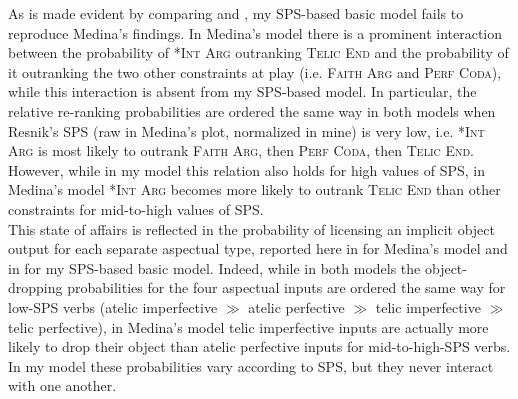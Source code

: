 As is made evident by comparing  and , my SPS-based basic model fails to reproduce Medina's findings. In Medina's model there is a prominent interaction between the probability of \textsc{*Int Arg} outranking \textsc{Telic End} and the probability of it outranking the two other constraints at play (i.e. \textsc{Faith Arg} and \textsc{Perf Coda}), while this interaction is absent from my SPS-based model. In particular, the relative re-ranking probabilities are ordered the same way in both models when Resnik's SPS (raw in Medina's plot, normalized in mine) is very low, i.e. \textsc{*Int Arg} is most likely to outrank \textsc{Faith Arg}, then \textsc{Perf Coda}, then \textsc{Telic End}. However, while in my model this relation also holds for high values of SPS, in Medina's model \textsc{*Int Arg} becomes more likely to outrank \textsc{Telic End} than other constraints for mid-to-high values of SPS.\\
This state of affairs is reflected in the probability of licensing an implicit object output for each separate aspectual type, reported here in  for Medina's model and in  for my SPS-based basic model. Indeed, while in both models the object-dropping probabilities for the four aspectual inputs are ordered the same way for low-SPS verbs (atelic imperfective $\gg$ atelic perfective $\gg$ telic imperfective $\gg$ telic perfective), in Medina's model telic imperfective inputs are actually more likely to drop their object than atelic perfective inputs for mid-to-high-SPS verbs. In my model these probabilities vary according to SPS, but they never interact with one another.\\
